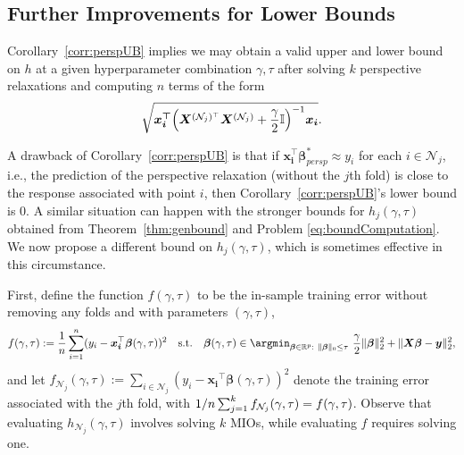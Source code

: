 \documentclass[mnsc,nonblindrev]{informs3} %
\newcommand{\ag}[1]{{\color{black}#1}}
\begin{document}


\subsection{\ag{Further Improvements for Lower Bounds}}\label{sec:genBounds}

Corollary~\ref{corr:perspUB} implies we may obtain a valid upper and lower bound on $h$ at a given hyperparameter combination $\gamma, \tau$ after solving $k$ perspective relaxations and computing $n$ terms of the form $$\sqrt{\bm{x_i^\top}\ag{\left(\bm{X}^{(\mathcal{N}_j)^\top} \bm{X}^{(\mathcal{N}_j)}+\frac{\gamma}{2}\mathbb{I}\right)^{-1}}\bm{x_i}}.$$ %

A drawback of Corollary~\ref{corr:perspUB} is that if $\bm{x_i^\top}\bm{\beta}_{persp}^*\approx y_i$ for each $i \in \mathcal{N}_j$, i.e., the prediction of the perspective relaxation (without \ag{the $j$th fold}) is close to the response associated with point $i$, then Corollary~\ref{corr:perspUB}'s lower bound is $0$. \ag{A similar situation can happen with the stronger bounds for $h_j(\gamma,\tau)$ obtained from Theorem~\ref{thm:genbound} and Problem \eqref{eq:boundComputation}.} We now propose a different bound on \ag{$h_j(\gamma,\tau)$}, which is sometimes effective in this circumstance.

First, define the function $f(\gamma,\tau)$ to be the in-sample training error \ag{without removing any folds and }with parameters $(\gamma, \tau)$,
\begin{equation*}
f(\gamma,\tau) := \frac{1}{n} \sum_{i=1}^n (y_i -\bm{x_i}^\top \bm{\beta}(\gamma, \tau))^2\quad
\text{s.t.} \quad  \bm{\beta}(\gamma, \tau) \in \argmin_{\bm{\beta} \in \mathbb{R}^p: \ \Vert \bm{\beta}\Vert_0 \leq \tau} \ \frac{\gamma}{2}\Vert \bm{\beta}\Vert_2^2 +\Vert \bm{X}\bm{\beta}-\bm{y}\Vert_2^2,
\end{equation*}
and let \ag{$f_{\mathcal{N}_j}(\gamma, \tau):=\sum_{i\in \mathcal{N}_j}\left(y_i -\bm{x_i}^\top \bm{\beta}(\gamma,\tau)\right)^2$} denote the training error \ag{associated with the $j$th fold}, with $\ag{1/n \sum_{j=1}^k f_{\mathcal{N}_j}(\gamma, \tau)}=f(\gamma, \tau)$. Observe that evaluating $h_{\mathcal{N}_j}(\gamma,\tau)$ involves solving \ag{$k$} MIOs, while evaluating $f$ requires solving one. 
\end{document}
